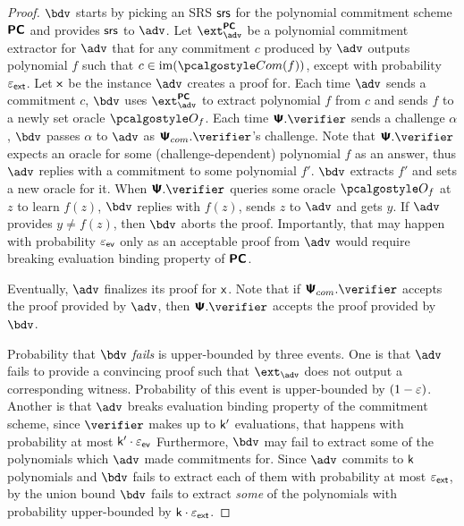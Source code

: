 \documentclass[runningheads,11pt]{llncs}
\begin{document}
{\begin{proof}
  $\bdv$ starts by picking an SRS $\mathsf{srs}$ for the polynomial commitment scheme
  $\bm{\mathsf{PC}}$ and provides $\mathsf{srs}$ to $\adv$. Let $\ext^{\PCOM}_\adv$ be a polynomial
  commitment extractor for $\adv$ that for any commitment $c$ produced by $\adv$
  outputs polynomial $f$ such that $c \in \image(\com(f))$, except with
  probability $\varepsilon_{\mathsf{ext}}$.  Let $\mathsf{x}$ be the instance $\adv$ creates a proof
  for. Each time $\adv$ sends a commitment $c$, $\bdv$ uses $\ext^{\PCOM}_\adv$
  to extract polynomial $f$ from $c$ and sends $f$ to a newly set oracle
  $\oracleo_f$.    Each time
  $\PS.\verifier$ sends a challenge $\alpha$, $\bdv$ passes $\alpha$ to $\adv$
  as $\PSc.\verifier$'s challenge. Note that $\PS.\verifier$ expects an oracle
  for some (challenge-dependent) polynomial $f$ as an answer, thus $\adv$
  replies with a commitment to some polynomial $f'$. $\bdv$ extracts $f'$ and
  sets a new oracle for it.  When $\PS.\verifier$ queries some oracle
  $\oracleo_f$ at $z$ to learn $f(z)$, $\bdv$ replies with $f(z)$, sends $z$
  to $\adv$ and gets $y$. If $\adv$ provides $y \neq f(z)$, then $\bdv$ aborts
  the proof. Importantly, that may happen with probability $\varepsilon_{\mathsf{ev}}$ only as an
  acceptable proof from $\adv$ would require breaking evaluation binding
  property of $\bm{\mathsf{PC}}$. 
  
  Eventually, $\adv$ finalizes its proof for $\mathsf{x}$. Note that
  if $\PSc.\verifier$ accepts the proof provided by $\adv$, then $\PS.\verifier$
  accepts the proof provided by $\bdv$.

  Probability that $\bdv$ \emph{fails} is upper-bounded by three events. One is
  that $\adv$ fails to provide a convincing proof such that $\ext_\adv$ does not
  output a corresponding witness. Probability of this event is upper-bounded by
  $(1 - \varepsilon)$. Another is that $\adv$ breaks evaluation binding property of the
  commitment scheme, since $\verifier$ makes up to $\mathsf{k'}$ evaluations, that
  happens with probability at most $\mathsf{k'} \cdot \varepsilon_{\mathsf{ev}}$ Furthermore, $\bdv$
  may fail to extract some of the polynomials which $\adv$ made commitments
  for. Since $\adv$ commits to $\mathsf{k}$ polynomials and $\bdv$ fails to extract
  each of them with probability at most $\varepsilon_{\mathsf{ext}}$, by the union bound $\bdv$
  fails to extract \emph{some} of the polynomials with probability upper-bounded
  by $\mathsf{k} \cdot \varepsilon_{\mathsf{ext}}$.


\end{proof}}
\end{document}
